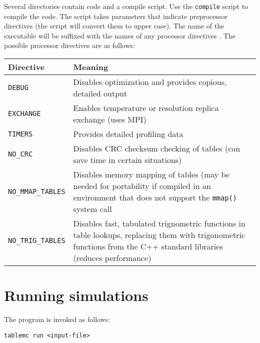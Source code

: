 \documentclass{article}      %
\begin{document}
Several directories contain code and a compile script. Use the \verb+compile+ script to compile the code.  The script takes parameters that indicate preprocessor directives (the script will convert them to upper case).  The name of the executable will be suffixed with the names of any processor directives .  The possible processor directives are as follows: \\
\begin{center}
\begin{tabular}{|l|p{8cm}|}
\hline
Directive & Meaning \\
\hline
\verb+DEBUG+ & Disables optimization and provides copious, detailed output \\
\hline
\verb+EXCHANGE+ & Enables temperature or resolution replica exchange (uses MPI) \\
\hline
\verb+TIMERS+ & Provides detailed profiling data \\
\hline
\verb+NO_CRC+ & Disables CRC checksum checking of tables (can save time in certain situations) \\
\hline
\verb+NO_MMAP_TABLES+ & Disables memory mapping of tables (may be needed for portability if compiled in an environment that does not support the \verb+mmap()+ system call \\
\hline
\verb+NO_TRIG_TABLES+ & Disables fast, tabulated trignometric functions in table lookups, replacing them with trigonometric functions from the C++ standard libraries (reduces performance) \\
\hline
\end{tabular}
\end{center}

\section{Running simulations}

The program is invoked as follows:
\begin{verbatim}
tablemc run <input-file>
\end{verbatim}
\end{document}
